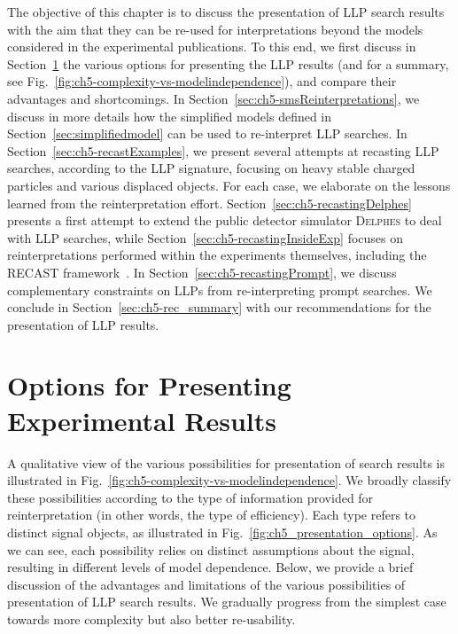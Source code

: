 The objective of this chapter is to discuss the presentation of LLP search results
with the aim that they can be re-used for interpretations beyond the models considered in the
experimental publications.
To this end, we first discuss in Section~\ref{sec:ch5-options} the various options
for presenting the LLP results (and for a summary, see Fig.~\ref{fig:ch5-complexity-vs-modelindependence}), and compare their advantages and
shortcomings.
In Section~\ref{sec:ch5-smsReinterpretations}, we discuss in more details how the simplified models defined in Section~\ref{sec:simplifiedmodel} can be used to re-interpret LLP searches.
In Section~\ref{sec:ch5-recastExamples}, we present several attempts at recasting LLP searches,
according to the LLP signature, focusing on heavy stable charged particles and various displaced objects. For each case,
we elaborate on the lessons learned from the reinterpretation effort.
Section~\ref{sec:ch5-recastingDelphes} presents a first attempt to
extend the public detector simulator \textsc{Delphes} %
to deal with LLP searches, while
Section~\ref{sec:ch5-recastingInsideExp} focuses on reinterpretations performed within the experiments themselves,
including the RECAST framework~\cite{Cranmer:2010hk}.
In Section~\ref{sec:ch5-recastingPrompt}, we discuss complementary constraints on LLPs from re-interpreting prompt searches.
We conclude in Section~\ref{sec:ch5-rec_summary} with our %
recommendations for the presentation of LLP results.


\section{Options for Presenting Experimental Results}
\label{sec:ch5-options}

A qualitative view of the various possibilities for presentation
of search results is illustrated in
Fig.~\ref{fig:ch5-complexity-vs-modelindependence}.
We broadly classify these possibilities according to the type of
information provided for reinterpretation (in other words, the type of efficiency).
Each type refers to distinct signal objects, as illustrated in
Fig.~\ref{fig:ch5_presentation_options}.
As we can see, each possibility relies on distinct assumptions about
the signal, resulting in different levels of model dependence.
Below, we provide a brief discussion of the advantages and limitations of the
various possibilities of presentation of LLP search results.
We gradually progress from the simplest case towards more complexity but
also better re-usability.

